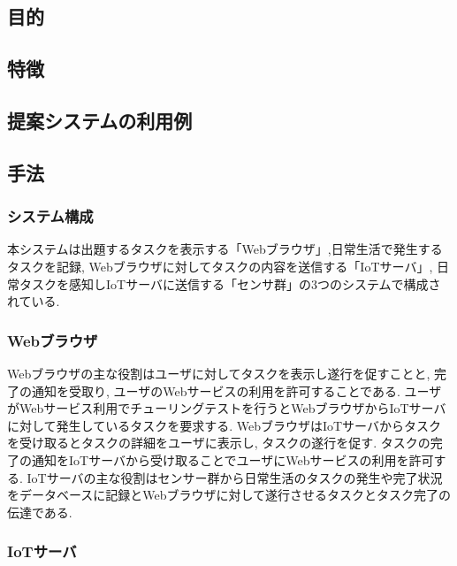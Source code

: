 \subsection{目的}\label{ux76eeux7684-1}

\subsection{特徴}\label{ux7279ux5fb4}

\subsection{提案システムの利用例}\label{ux63d0ux6848ux30b7ux30b9ux30c6ux30e0ux306eux5229ux7528ux4f8b}

\subsection{手法}\label{ux624bux6cd5}

\subsubsection{システム構成}\label{ux30b7ux30b9ux30c6ux30e0ux69cbux6210}

本システムは出題するタスクを表示する「Webブラウザ」,日常生活で発生するタスクを記録,
Webブラウザに対してタスクの内容を送信する「IoTサーバ」,
日常タスクを感知しIoTサーバに送信する「センサ群」の3つのシステムで構成されている.

\subsubsection{Webブラウザ}\label{webux30d6ux30e9ux30a6ux30b6}

Webブラウザの主な役割はユーザに対してタスクを表示し遂行を促すことと,
完了の通知を受取り, ユーザのWebサービスの利用を許可することである.
ユーザがWebサービス利用でチューリングテストを行うとWebブラウザからIoTサーバに対して発生しているタスクを要求する.
WebブラウザはIoTサーバからタスクを受け取るとタスクの詳細をユーザに表示し,
タスクの遂行を促す.
タスクの完了の通知をIoTサーバから受け取ることでユーザにWebサービスの利用を許可する.
IoTサーバの主な役割はセンサー群から日常生活のタスクの発生や完了状況をデータベースに記録とWebブラウザに対して遂行させるタスクとタスク完了の伝達である.

\subsubsection{IoTサーバ}\label{iotux30b5ux30fcux30d0}

